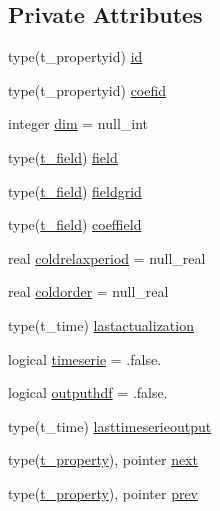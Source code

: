 \subsection*{Private Attributes}
\begin{DoxyCompactItemize}
\item 
type(t\+\_\+propertyid) \mbox{\hyperlink{structmoduleassimilation_1_1t__property_a6dc49a2d020611b861c6041867ca8124}{id}}
\item 
type(t\+\_\+propertyid) \mbox{\hyperlink{structmoduleassimilation_1_1t__property_ac4bb8a6df14fb0634c2e19c772e5bbfc}{coefid}}
\item 
integer \mbox{\hyperlink{structmoduleassimilation_1_1t__property_ac6ff6c9bb8152ae3b2643734373b11b1}{dim}} = null\+\_\+int
\item 
type(\mbox{\hyperlink{structmoduleassimilation_1_1t__field}{t\+\_\+field}}) \mbox{\hyperlink{structmoduleassimilation_1_1t__property_af15a79521ab3259690b9c67a690a57b3}{field}}
\item 
type(\mbox{\hyperlink{structmoduleassimilation_1_1t__field}{t\+\_\+field}}) \mbox{\hyperlink{structmoduleassimilation_1_1t__property_aad1fc8b81c2ef22938643db1d0fdcf35}{fieldgrid}}
\item 
type(\mbox{\hyperlink{structmoduleassimilation_1_1t__field}{t\+\_\+field}}) \mbox{\hyperlink{structmoduleassimilation_1_1t__property_a6435059073c39d0822e824a7081d2385}{coeffield}}
\item 
real \mbox{\hyperlink{structmoduleassimilation_1_1t__property_a5f14b6aa26fd477b893ac4d272db9db5}{coldrelaxperiod}} = null\+\_\+real
\item 
real \mbox{\hyperlink{structmoduleassimilation_1_1t__property_ae0a9eb82f73865054a905a40c553106f}{coldorder}} = null\+\_\+real
\item 
type(t\+\_\+time) \mbox{\hyperlink{structmoduleassimilation_1_1t__property_a5fa030b004d5035f8913ca04bd5c6962}{lastactualization}}
\item 
logical \mbox{\hyperlink{structmoduleassimilation_1_1t__property_abeaf36e010de9050c48f116ba7437480}{timeserie}} = .false.
\item 
logical \mbox{\hyperlink{structmoduleassimilation_1_1t__property_aa92aa166bda0704ab0d75438749e87ed}{outputhdf}} = .false.
\item 
type(t\+\_\+time) \mbox{\hyperlink{structmoduleassimilation_1_1t__property_a98ac4b1d727aac3b5a833c7570bc9465}{lasttimeserieoutput}}
\item 
type(\mbox{\hyperlink{structmoduleassimilation_1_1t__property}{t\+\_\+property}}), pointer \mbox{\hyperlink{structmoduleassimilation_1_1t__property_a5ec1a111f966eb6f32d0eea9676d520e}{next}}
\item 
type(\mbox{\hyperlink{structmoduleassimilation_1_1t__property}{t\+\_\+property}}), pointer \mbox{\hyperlink{structmoduleassimilation_1_1t__property_aa6d418e7e5377f4349434fa77a29d3a2}{prev}}
\end{DoxyCompactItemize}


